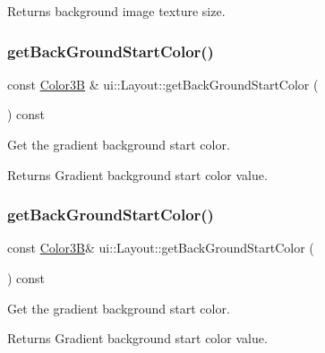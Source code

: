\begin{DoxyReturn}{Returns}
background image texture size. 
\end{DoxyReturn}
\mbox{\label{classui_1_1Layout_ac61aae4587926c5987538dcf4593b0db}} 
\subsubsection{\texorpdfstring{get\+Back\+Ground\+Start\+Color()}{getBackGroundStartColor()}\hspace{0.1cm}{\footnotesize\ttfamily [1/2]}}
{\footnotesize\ttfamily const \hyperlink{structColor3B}{Color3B} \& ui\+::\+Layout\+::get\+Back\+Ground\+Start\+Color (\begin{DoxyParamCaption}{ }\end{DoxyParamCaption}) const}

Get the gradient background start color. \begin{DoxyReturn}{Returns}
Gradient background start color value. 
\end{DoxyReturn}
\mbox{\label{classui_1_1Layout_a7a34d51eceeb2485877fcfc4efabf789}} 
\subsubsection{\texorpdfstring{get\+Back\+Ground\+Start\+Color()}{getBackGroundStartColor()}\hspace{0.1cm}{\footnotesize\ttfamily [2/2]}}
{\footnotesize\ttfamily const \hyperlink{structColor3B}{Color3B}\& ui\+::\+Layout\+::get\+Back\+Ground\+Start\+Color (\begin{DoxyParamCaption}{ }\end{DoxyParamCaption}) const}

Get the gradient background start color. \begin{DoxyReturn}{Returns}
Gradient background start color value. 
\end{DoxyReturn}
\mbox{\label{classui_1_1Layout_a2b35ce1ed11a45f7628305a32029c083}} 
